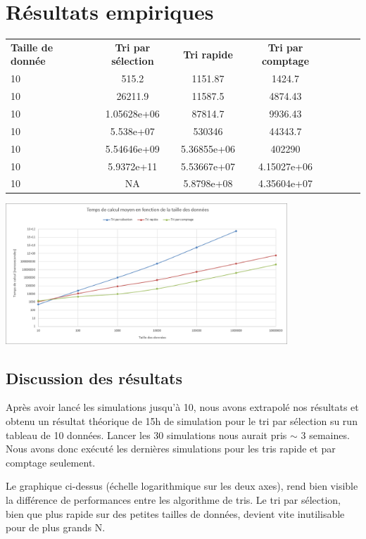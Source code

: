 \documentclass[11pt]{article}
\begin{document}
\section*{Résultats empiriques}

\begin{tabular}{|l c c c|c c c|}
\hline
\textbf{Taille de donnée} & \textbf{Tri par sélection} & \textbf{Tri rapide}&  \textbf{Tri par comptage} \\
10\up{1}& 515.2 & 1151.87 & 1424.7  \\
10\up{2}& 26211.9 & 11587.5 & 4874.43  \\
10\up{3}& 1.05628e+06  & 87814.7 & 9936.43  \\
10\up{4}& 5.538e+07 & 530346 & 44343.7  \\
10\up{5}& 5.54646e+09 & 5.36855e+06 & 402290  \\
10\up{6}& 5.9372e+11 & 5.53667e+07 & 4.15027e+06  \\
10\up{7}& NA & 5.8798e+08 & 4.35604e+07  \\
\hline
\end{tabular}

\medskip

\noindent\includegraphics[width=400px]{tests/graphique}

\subsection*{Discussion des résultats}
Après avoir lancé les simulations jusqu'à 10, nous avons extrapolé nos résultats et obtenu un résultat théorique de 15h de simulation pour le tri par sélection su run tableau de 10 données. Lancer les 30 simulations nous aurait pris $\sim $ 3 semaines. Nous avons donc exécuté les dernières simulations pour les tris rapide et par comptage seulement.

Le graphique ci-dessus (échelle logarithmique sur les deux axes), rend bien visible la différence de performances entre les algorithme de tris. Le tri par sélection, bien que plus rapide sur des petites tailles de données, devient vite inutilisable pour de plus grands N.
\end{document}
